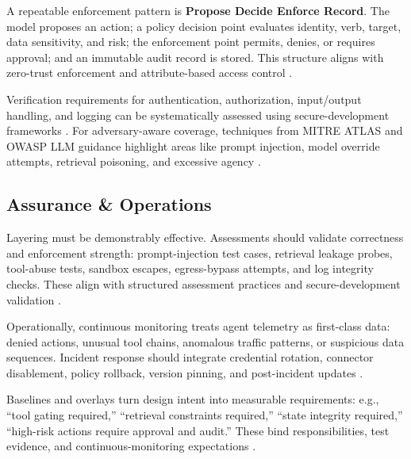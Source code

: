 \begin{TNtwocol}
      A repeatable enforcement pattern is \textbf{Propose \rightarrow Decide \rightarrow Enforce \rightarrow Record}. The model proposes an action; a policy decision point evaluates identity, verb, target, data sensitivity, and risk; the enforcement point permits, denies, or requires approval; and an immutable audit record is stored. This structure aligns with zero-trust enforcement and attribute-based access control \cite{NIST_SP800_207,NIST_SP800_162,NIST_SP800_207A}.

      Verification requirements for authentication, authorization, input/output handling, and logging can be systematically assessed using secure-development frameworks \cite{NIST_SP800_218,ISO_27002_2022}. For adversary-aware coverage, techniques from MITRE ATLAS and OWASP LLM guidance highlight areas like prompt injection, model override attempts, retrieval poisoning, and excessive agency \cite{MITRE_ATLAS,OWASP_LLM_Top10,OWASP_LLM_Top10_PDF,OWASP_Prompt_Injection_CS}.

      \subsection{Assurance \& Operations}

      Layering must be demonstrably effective. Assessments should validate correctness and enforcement strength: prompt-injection test cases, retrieval leakage probes, tool-abuse tests, sandbox escapes, egress-bypass attempts, and log integrity checks. These align with structured assessment practices and secure-development validation \cite{NIST_SP800_218,NIST_SP800_50R1}.

      Operationally, continuous monitoring treats agent telemetry as first-class data: denied actions, unusual tool chains, anomalous traffic patterns, or suspicious data sequences. Incident response should integrate credential rotation, connector disablement, policy rollback, version pinning, and post-incident updates \cite{NIST_SP800_137,NSA_Network_Guide_2023}.

      Baselines and overlays turn design intent into measurable requirements: e.g., “tool gating required,” “retrieval constraints required,” “state integrity required,” “high-risk actions require approval and audit.” These bind responsibilities, test evidence, and continuous-monitoring expectations \cite{CIS_Controls_v8_1,CIS_Cloud_Companion_v8_1,NIST_SP1800_35}.



\end{TNtwocol}
